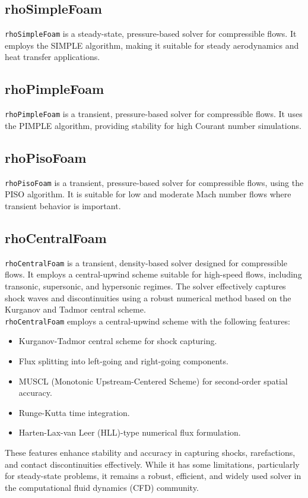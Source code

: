 \documentclass[a5paper]{sapthesis}
\begin{document}
	\subsection*{rhoSimpleFoam}
	\texttt{rhoSimpleFoam} is a steady-state, pressure-based solver for compressible flows. It employs the SIMPLE  algorithm, making it suitable for steady aerodynamics and heat transfer applications.
	
	\subsection*{rhoPimpleFoam}
	\texttt{rhoPimpleFoam} is a transient, pressure-based solver for compressible flows. It uses the PIMPLE algorithm, providing stability for high Courant number simulations.
		
	\subsection*{rhoPisoFoam}
	\texttt{rhoPisoFoam} is a transient, pressure-based solver for compressible flows, using the PISO algorithm. It is suitable for low and moderate Mach number flows where transient behavior is important.
		
		
	\subsection*{rhoCentralFoam}
	
	\texttt{rhoCentralFoam} is a transient, density-based solver designed for compressible flows. It employs a central-upwind scheme suitable for high-speed flows, including transonic, supersonic, and hypersonic regimes. The solver effectively captures shock waves and discontinuities using a robust numerical method based on the Kurganov and Tadmor central scheme.
	\\
	\texttt{rhoCentralFoam} employs a central-upwind scheme with the following features:
	\begin{itemize}
		\item Kurganov-Tadmor central scheme for shock capturing.
		\item Flux splitting into left-going and right-going components.
		\item MUSCL (Monotonic Upstream-Centered Scheme) for second-order spatial accuracy.
		\item Runge-Kutta time integration.
		\item Harten-Lax-van Leer (HLL)-type numerical flux formulation.
	\end{itemize}
	These features enhance stability and accuracy in capturing shocks, rarefactions, and contact discontinuities effectively. While it has some limitations, particularly for steady-state problems, it remains a robust, efficient, and widely used solver in the computational fluid dynamics (CFD) community.
		
\end{document}
